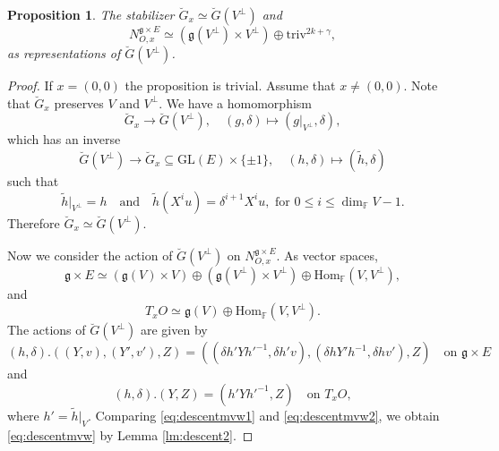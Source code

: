 \documentclass[12pt]{amsart}
\newtheorem{prop}[lm]{Proposition}
\theoremstyle{definition}
\theoremstyle{remark}\newtheorem{rmk}[lm]{Remark}
\newcommand{\GL}{{\mathrm{GL}}}
\newcommand{\Hom}{{\mathrm{Hom}}}
\newcommand{\triv}{\mathrm{triv}}
\newcommand{\g}{\mathfrak g}
\newcommand{\C}{\mathbb{F}}
\begin{document}
    \begin{prop}
    	\label{prop:descentmvw}
    	The stabilizer $\breve{G}_x\simeq\breve{G}(V^{\bot})$ and 
    	\begin{equation}
    		\label{eq:descentmvw}
    		N_{O,x}^{\g\times E}\simeq(\g(V^{\bot})\times V^{\bot})\oplus\triv^{2k+\gamma},
    	\end{equation}
    	as representations of $\breve{G}(V^{\bot})$.
    \end{prop}
    \begin{proof}
    	If $x=(0,0)$ the proposition is trivial. Assume that $x\neq (0,0)$. Note that $\breve{G}_x$ preserves $V$ and $V^{\bot}$. We have a homomorphism
    	\begin{equation*}
    		\breve{G}_x\to\breve{G}(V^{\bot}),\quad (g,\delta)\mapsto (g|_{V^{\bot}},\delta),
    	\end{equation*}
    	which has an inverse
    	\begin{equation*}
    		\breve{G}(V^{\bot})\to\breve{G}_x\subseteq\GL(E)\times\{\pm 1\},\quad(h,\delta)\mapsto(\tilde{h},\delta)
    	\end{equation*}
    	such that
    	\begin{equation*}
    		\tilde{h}|_{V^{\bot}}=h\quad\text{and}\quad\tilde{h}(X^iu)=\delta^{i+1}X^iu,\text{ for }0\leq i\leq\dim_{\C}V-1.
    	\end{equation*}
    	Therefore $\breve{G}_x\simeq\breve{G}(V^{\bot})$.
    	
    	Now we consider the action of $\breve{G}(V^{\bot})$ on $N_{O,x}^{\g\times E}$. As vector spaces,
    	\begin{equation*}
    		\g\times E\simeq(\g(V)\times V)\oplus(\g(V^{\bot})\times V^{\bot})\oplus\Hom_{\C}(V,V^{\bot}),
    	\end{equation*}
    	and
    	\begin{equation*}
    		T_xO\simeq\g(V)\oplus\Hom_{\C}(V,V^{\bot}).
    	\end{equation*}
    	The actions of $\breve{G}(V^{\bot})$ are given by
    	\begin{equation}
    		\label{eq:descentmvw1}
    		(h,\delta).((Y,v),(Y',v'),Z)=((\delta h'Yh'^{-1},\delta h'v),(\delta hY'h^{-1},\delta hv'),Z)\quad\text{on }\g\times E
    	\end{equation}
    	and
    	\begin{equation}
    		\label{eq:descentmvw2}
    		(h,\delta).(Y,Z)=(h'Yh'^{-1},Z)\quad\text{on }T_xO,
    	\end{equation}
    	where $h'=\tilde{h}|_V$. Comparing \eqref{eq:descentmvw1} and \eqref{eq:descentmvw2}, we obtain \eqref{eq:descentmvw} by Lemma \ref{lm:descent2}.
    \end{proof}
    
\end{document}
